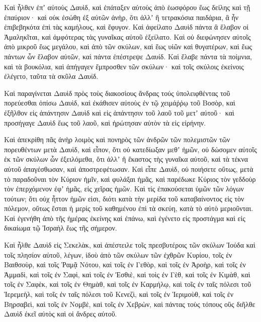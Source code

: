 {Καὶ ἦλθεν ἐπʼ αὐτοὺς Δαυὶδ, καὶ ἐπάταξεν αὐτοὺς ἀπὸ ἑωσφόρου ἕως δείλης καὶ τῇ ἐπαύριον· καὶ οὐκ ἐσώθη ἐξ αὐτῶν ἀνὴρ, ὅτι ἀλλʼ ἢ τετρακόσια παιδάρια, ἃ ἦν ἐπιβεβηκότα ἐπὶ τὰς καμήλους, καὶ ἔφυγον.
Καὶ ἀφείλατο Δαυὶδ πάντα ἃ ἔλαβον οἱ Ἀμαληκῖται, καὶ ἀμφότερας τὰς γυναῖκας αὐτοῦ ἐξείλατο.
Καὶ οὐ διεφώνησεν αὐτοῖς ἀπὸ μικροῦ ἕως μεγάλου, καὶ ἀπὸ τῶν σκύλων, καὶ ἕως υἱῶν καὶ θυγατέρων, καὶ ἕως πάντων ὧν ἔλαβον αὐτῶν, καὶ πάντα ἐπέστρεψε Δαυίδ.
Καὶ ἔλαβε πάντα τὰ ποίμνια, καὶ τὰ βουκόλια, καὶ ἀπήγαγεν ἔμπροσθεν τῶν σκύλων· καὶ τοῖς σκύλοις ἐκείνοις ἐλέγετο, ταῦτα τὰ σκῦλα Δαυίδ.
\par }{\PP {}Καὶ παραγίνεται Δαυὶδ πρὸς τοὺς διακοσὶους ἄνδρας τούς ὑπολειφθέντας τοῦ πορεύεσθαι ὀπίσω Δαυὶδ, καὶ ἐκάθισεν αὐτοὺς ἐν τῷ χειμάῤῥῳ τοῦ Βοσὸρ, καὶ ἐξῆλθον εἰς ἀπάντησιν Δαυὶδ καὶ εἰς ἀπάντησιν τοῦ λαοῦ τοῦ μετʼ αὐτοῦ· καὶ προσήγαγε Δαυὶδ ἕως τοῦ λαοῦ, καὶ ἠρώτησαν αὐτὸν τὰ εἰς εἰρήνην.
\par }{\PP {}Καὶ ἀπεκρίθη πᾶς ἀνὴρ λοιμὸς καὶ πονηρὸς τῶν ἀνδρῶν τῶν πολεμιστῶν τῶν πορευθέντων μετὰ Δαυὶδ, καὶ εἶπον, ὅτι οὐ κατεδίωξαν μεθʼ ἡμῶν, οὐ δώσομεν αὐτοῖς ἐκ τῶν σκύλων ὧν ἐξειλόμεθα, ὅτι ἀλλʼ ἢ ἕκαστος τὴς γυναῖκα αὐτοῦ, καὶ τὰ τέκνα αὐτοῦ ἀπαγέσθωσαν, καὶ ἀποστρεφέτωσαν.
Καὶ εἶπε Δαυὶδ, οὐ ποιήσετε οὕτως, μετὰ τὸ παραδοῦναι τὸν Κύριον ἡμῖν, καὶ φυλάξαι ἡμᾶς, καὶ παρέδωκε Κύριος τὸν γεδδοὺρ τὸν ἐπερχόμενον ἐφʼ ἡμᾶς, εἰς χεῖρας ἡμῶν.
Καὶ τίς ἐπακούσεται ὑμῶν τῶν λόγων τούτων; ὅτι οὐχ ἧττον ἡμῶν εἰσι, διότι κατὰ τὴν μερίδα τοῦ καταβαίνοντος εἰς τὸν πόλεμον, οὕτως ἔσται ἡ μερὶς τοῦ καθημένου ἐπὶ τὰ σκεύη, κατὰ τὸ αὐτὸ μεριοῦνται.
Καὶ ἐγενήθη ἀπὸ τῆς ἡμέρας ἐκείνης καὶ ἐπάνω, καὶ ἐγένετο εἰς προστάγμα καὶ εἱς δικαίωμα τῷ Ἰσραὴλ ἕως τῆς σήμερον.
\par }{\PP {}Καὶ ἦλθε Δαυὶδ εἰς Σεκελὰκ, καὶ ἀπέστειλε τοῖς πρεσβυτέροις τῶν σκύλων Ἰούδα καὶ τοῖς πλησίον αὐτοῦ, λέγων, ἰδοὺ ἀπὸ τῶν σκύλων τῶν ἐχθρῶν Κυρίου,
τοῖς ἐν Βαιθσοὺρ, καὶ τοῖς Ῥαμᾷ Νότου, καὶ τοῖς ἐν Γεθὸρ,
καὶ τοῖς ἐν Ἀροὴρ, καὶ τοῖς ἐν Ἀμμαδὶ, καὶ τοῖς ἐν Σαφὶ, καὶ τοῖς ἐν Ἐσθιὲ,
καὶ τοὶς ἐν Γὲθ, καὶ τοῖς ἐν Κιμὰθ, καὶ τοῖς ἐν Σαφὲκ, καὶ τοῖς ἐν Θημὰθ,
καὶ τοῖς ἐν Καρμήλῳ, καὶ τοῖς ἐν ταῖς πόλεσι τοῦ Ἱερεμεὴλ, καὶ τοῖς ἐν ταῖς πόλεσι τοῦ Κενεζὶ,
καὶ τοῖς ἐν Ἱεριμοὺθ, καὶ τοῖς ἐν Βηρσαβεὶ, καὶ τοῖς ἐν Νομβὲ,
καὶ τοῖς ἐν Χεβρὼν, καὶ πάντας τοὺς τόπους οὓς διῆλθε Δαυὶδ ἐκεῖ αὐτὸς καὶ οἱ ἄνδρες αὐτοῦ.

}
